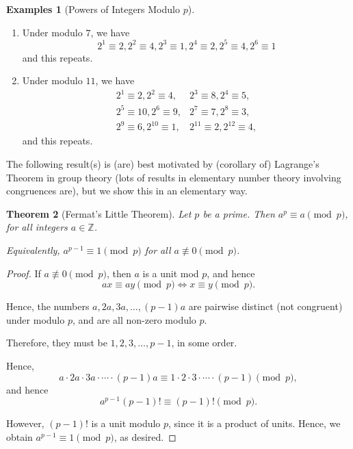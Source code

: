 \documentclass{article}
\newtheorem{theorem}{Theorem}[section]
\theoremstyle{definition}
\newtheorem{examples}[theorem]{Examples}
\theoremstyle{remark}
\newcommand{\pqty}[1]{\left(#1\right)}
\newcommand{\nequiv}{\not\equiv}
\newcommand{\ZZ}{\mathbb{Z}}
\begin{document}
\begin{examples}[Powers of Integers Modulo \(p\)]
    \begin{enumerate}
        \item Under modulo \(7\), we have
        \[
            2^1 \equiv 2, 2^2 \equiv 4, 2^3 \equiv 1, 2^4 \equiv 2, 2^5 \equiv 4, 2^6 \equiv 1
        \]
        and this repeats.

        \item Under modulo \(11\), we have
        \begin{align*}
            2^1 \equiv 2, 2^2 \equiv 4, & 2^3 \equiv 8, 2^4 \equiv 5, \\
            2^5 \equiv 10, 2^6 \equiv 9, & 2^7 \equiv 7, 2^8 \equiv 3, \\
            2^9 \equiv 6, 2^{10} \equiv 1, & 2^{11} \equiv 2, 2^{12} \equiv 4,
        \end{align*}
        and this repeats.
    \end{enumerate}
\end{examples}

The following result(s) is (are) best motivated by (corollary of) Lagrange's Theorem in group theory (lots of results in elementary number theory involving congruences are), but we show this in an elementary way.

\begin{theorem}[Fermat's Little Theorem]
    Let \(p\) be a prime. Then \(a^p \equiv a \pmod{p}\), for all integers \(a \in \ZZ\).

    Equivalently, \(a^{p - 1} \equiv 1 \pmod{p}\) for all \(a \nequiv 0 \pmod{p}\).
\end{theorem}

\begin{proof}
    If \(a \nequiv 0 \pmod{p}\), then \(a\) is a unit mod \(p\), and hence
    \[
        ax \equiv ay \pmod{p} \iff x \equiv y \pmod{p}.
    \]

    Hence, the numbers \(a, 2a, 3a, \ldots, \pqty{p - 1}a\) are pairwise distinct (not congruent) under modulo \(p\), and are all non-zero modulo \(p\).

    Therefore, they must be \(1, 2, 3, \ldots, p - 1\), in some order.

    Hence,
    \[
        a \cdot 2a \cdot 3a \cdot \cdots \cdot \pqty{p - 1} a \equiv 1 \cdot 2 \cdot 3 \cdot \cdots \cdot \pqty{p - 1} \pmod{p},
    \]
    and hence
    \[
        a^{p - 1} \pqty{p - 1}! \equiv \pqty{p - 1}! \pmod{p}.
    \]

    However, \(\pqty{p - 1}!\) is a unit modulo \(p\), since it is a product of units. Hence, we obtain \(a^{p - 1} \equiv 1 \pmod{p}\), as desired.
\end{proof}
\end{document}
